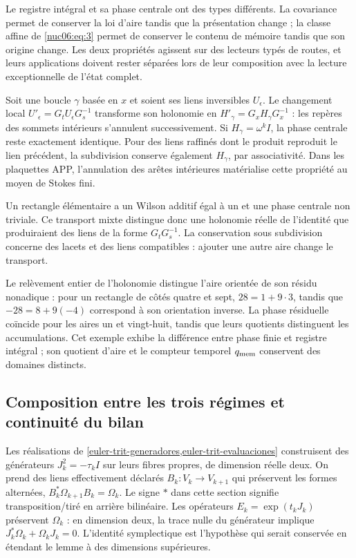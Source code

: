 Le registre intégral et sa phase centrale ont des types différents. La covariance permet de conserver la loi d’aire tandis que la présentation change ; la classe affine de \eqref{nuc06:eq:3} permet de conserver le contenu de mémoire tandis que son origine change. Les deux propriétés agissent sur des lecteurs typés de routes, et leurs applications doivent rester séparées lors de leur composition avec la lecture exceptionnelle de l’état complet.

\begin{proposition}

Soit une boucle \(\gamma\) basée en \(x\) et soient ses liens inversibles \(U_\epsilon\). Le changement local \(U'_\epsilon=G_tU_\epsilon G_s^{-1}\) transforme son holonomie en \(H'_\gamma=G_xH_\gamma G_x^{-1}\) : les repères des sommets intérieurs s’annulent successivement. Si \(H_\gamma=\omega^kI\), la phase centrale reste exactement identique. Pour des liens raffinés dont le produit reproduit le lien précédent, la subdivision conserve également \(H_\gamma\), par associativité. Dans les plaquettes APP, l’annulation des arêtes intérieures matérialise cette propriété au moyen de Stokes fini.

\end{proposition}

Un rectangle élémentaire a un Wilson additif égal à un et une phase centrale non triviale. Ce transport mixte distingue donc une holonomie réelle de l’identité que produiraient des liens de la forme \(G_tG_s^{-1}\). La conservation sous subdivision concerne des lacets et des liens compatibles : ajouter une autre aire change le transport.

Le relèvement entier de l’holonomie distingue l’aire orientée de son résidu nonadique : pour un rectangle de côtés quatre et sept, \(28=1+9\cdot3\), tandis que \(-28=8+9(-4)\) correspond à son orientation inverse. La phase résiduelle coïncide pour les aires un et vingt-huit, tandis que leurs quotients distinguent les accumulations. Cet exemple exhibe la différence entre phase finie et registre intégral ; son quotient d’aire et le compteur temporel \(q_{\rm mem}\) conservent des domaines distincts.

\subsection{Composition entre les trois régimes et continuité du bilan
}

Les réalisations de \cref{euler-trit-generadores,euler-trit-evaluaciones} construisent des générateurs \(J_k^2=-\tau_kI\) sur leurs fibres propres, de dimension réelle deux. On prend des liens effectivement déclarés \(B_k:V_k\to V_{k+1}\) qui préservent les formes alternées, \(B_k^*\Omega_{k+1}B_k=\Omega_k\). Le signe \(*\) dans cette section signifie transposition/tiré en arrière bilinéaire. Les opérateurs \(E_k=\exp(t_kJ_k)\) préservent \(\Omega_k\) : en dimension deux, la trace nulle du générateur implique \(J_k^*\Omega_k+\Omega_kJ_k=0\). L’identité symplectique est l’hypothèse qui serait conservée en étendant le lemme à des dimensions supérieures.

